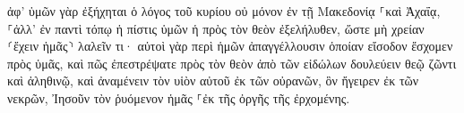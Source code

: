 \documentclass{openreader}
\begin{document}
ἀφ’ ὑμῶν γὰρ ἐξήχηται ὁ λόγος τοῦ κυρίου οὐ μόνον ἐν τῇ Μακεδονίᾳ ⸀καὶ Ἀχαΐᾳ, ⸀ἀλλ’ ἐν παντὶ τόπῳ ἡ πίστις ὑμῶν ἡ πρὸς τὸν θεὸν ἐξελήλυθεν, ὥστε μὴ χρείαν ⸂ἔχειν ἡμᾶς⸃ λαλεῖν τι· 
αὐτοὶ γὰρ περὶ ἡμῶν ἀπαγγέλλουσιν ὁποίαν εἴσοδον ἔσχομεν πρὸς ὑμᾶς, καὶ πῶς ἐπεστρέψατε πρὸς τὸν θεὸν ἀπὸ τῶν εἰδώλων δουλεύειν θεῷ ζῶντι καὶ ἀληθινῷ, 
καὶ ἀναμένειν τὸν υἱὸν αὐτοῦ ἐκ τῶν οὐρανῶν, ὃν ἤγειρεν ἐκ τῶν νεκρῶν, Ἰησοῦν τὸν ῥυόμενον ἡμᾶς ⸀ἐκ τῆς ὀργῆς τῆς ἐρχομένης. 
\end{document}
